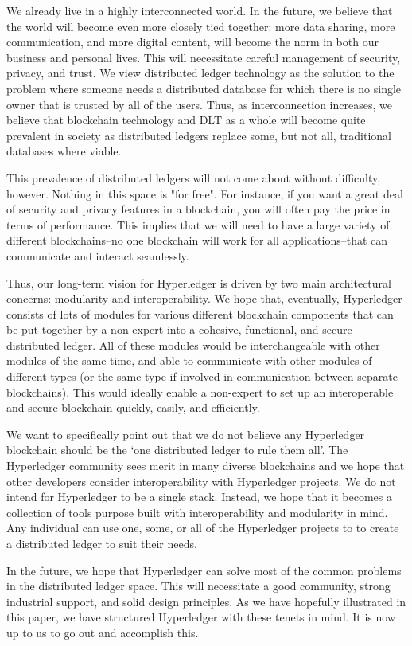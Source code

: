 We already live in a highly interconnected world. In the future, we believe that the world will become even more closely tied together: more data sharing, more communication, and more digital content, will become the norm in both our business and personal lives. This will necessitate careful management of security, privacy, and trust. We view distributed ledger technology as the solution to the problem where someone needs a distributed database for which there is no single owner that is trusted by all of the users. Thus, as interconnection increases, we believe that blockchain technology and DLT as a whole will become quite prevalent in society as distributed ledgers replace some, but not all, traditional databases where viable.

This prevalence of distributed ledgers will not come about without difficulty, however. Nothing in this space is "for free". For instance, if you want a great deal of security and privacy features in a blockchain, you will often pay the price in terms of performance. This implies that we will need to have a large variety of different blockchains--no one blockchain will work for all applications--that can communicate and interact seamlessly.

Thus, our long-term vision for Hyperledger is driven by two main architectural concerns: modularity and interoperability. We hope that, eventually, Hyperledger consists of lots of modules for various different blockchain components that can be put together by a non-expert into a cohesive, functional, and secure distributed ledger. All of these modules would be interchangeable with other modules of the same time, and able to communicate with other modules of different types (or the same type if involved in communication between separate blockchains). This would ideally enable a non-expert to set up an interoperable and secure blockchain quickly, easily, and efficiently.

We want to specifically point out that we do not believe any Hyperledger blockchain should be the `one distributed ledger to rule them all'. The Hyperledger community sees merit in many diverse blockchains and we hope that other developers consider interoperability with Hyperledger projects. We do not intend for Hyperledger to be a single stack. Instead, we hope that it becomes a collection of tools purpose built with interoperability and modularity in mind. Any individual can use one, some, or all of the Hyperledger projects to to create a distributed ledger to suit their needs.

In the future, we hope that Hyperledger can solve most of the common problems in the distributed ledger space. This will necessitate a good community, strong industrial support, and solid design principles. As we have hopefully illustrated in this paper, we have structured Hyperledger with these tenets in mind. It is now up to us to go out and accomplish this.
